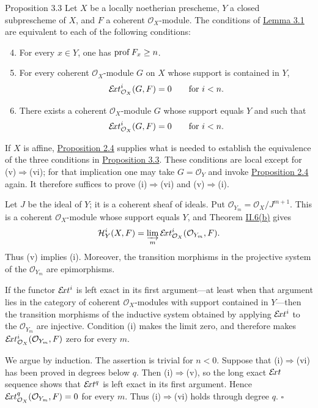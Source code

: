\begin{sgastatement}{Proposition 3.3}
Let $X$ be a locally noetherian prescheme, $Y$ a closed subprescheme of $X$,
and $F$ a coherent $\mathcal O_X$-module. The conditions of \hyperref[III.3.1]{Lemma 3.1} are
equivalent to each of the following conditions:
\begin{enumerate}[label=\textup{(\roman*)},leftmargin=2.8em]
\setcounter{enumi}{3}
\item For every $x\in Y$, one has $\operatorname{prof} F_x\ge n$.
\item For every coherent $\mathcal O_X$-module $G$ on $X$ whose support is
contained in $Y$,
\[
  \mathcal E\!xt_{\mathcal O_X}^i(G,F)=0\qquad\text{for }i<n.
\]
\item There exists a coherent $\mathcal O_X$-module $G$ whose support equals
$Y$ and such that
\[
  \mathcal E\!xt_{\mathcal O_X}^i(G,F)=0\qquad\text{for }i<n.
\]
\end{enumerate}
\end{sgastatement}

If $X$ is affine, \hyperref[III.2.4]{Proposition 2.4} supplies what is needed to establish the
equivalence of the three conditions in \hyperref[III.3.3]{Proposition 3.3}. These conditions are
local except for (v)$\Rightarrow$(vi); for that implication one may take
$G=\mathcal O_Y$ and invoke \hyperref[III.2.4]{Proposition 2.4} again. It therefore suffices to
prove (i)$\Rightarrow$(vi) and (v)$\Rightarrow$(i).

Let $J$ be the ideal of $Y$; it is a coherent sheaf of ideals. Put
$\mathcal O_{Y_m}=\mathcal O_X/J^{m+1}$. This is a coherent
$\mathcal O_X$-module whose support equals $Y$, and Theorem \hyperref[II.6]{II.6(b)} gives
\[
  \mathcal H_Y^i(X,F)=\varinjlim_m
  \mathcal E\!xt_{\mathcal O_X}^i(\mathcal O_{Y_m},F).
\]
Thus (v) implies (i). Moreover, the transition morphisms in the
projective system of the $\mathcal O_{Y_m}$ are epimorphisms.

If the functor $\mathcal E\!xt^i$ is left exact in its first argument---at least when
that argument lies in the category of coherent $\mathcal O_X$-modules with
support contained in $Y$---then the transition morphisms of the inductive
system obtained by applying $\mathcal E\!xt^i$ to the $\mathcal O_{Y_m}$ are
injective. Condition (i) makes the limit zero, and therefore makes
$\mathcal E\!xt_{\mathcal O_X}^i(\mathcal O_{Y_m},F)$ zero for every $m$.

We argue by induction. The assertion is trivial for $n<0$. Suppose that
(i)$\Rightarrow$(vi) has been proved in degrees below $q$. Then
(i)$\Rightarrow$(v), so the long exact $\mathcal E\!xt$ sequence shows that
$\mathcal E\!xt^q$ is left exact in its first argument. Hence
$\mathcal E\!xt_{\mathcal O_X}^q(\mathcal O_{Y_m},F)=0$ for every $m$. Thus
(i)$\Rightarrow$(vi) holds through degree $q$.
\hfill$\square$\par


